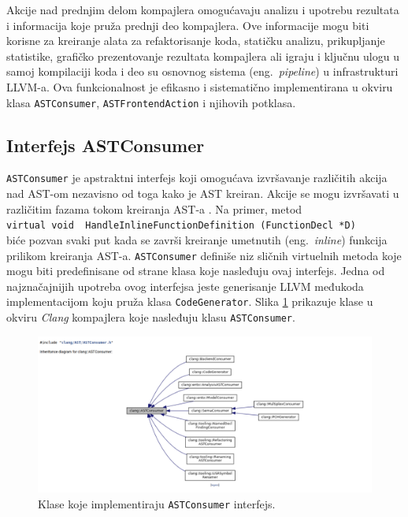 \documentclass[12pt,oneside]{memoir}
\begin{document}
Akcije nad prednjim delom kompajlera omogu\'{c}avaju analizu i upotrebu rezultata i informacija koje pru\v{z}a prednji deo kompajlera. Ove informacije mogu biti korisne za kreiranje alata za refaktorisanje koda, stati\v{c}ku analizu, prikupljanje statistike, grafi\v{c}ko prezentovanje rezultata kompajlera ali igraju i klju\v{c}nu ulogu u samoj kompilaciji koda i deo su osnovnog sistema (eng.~\textit{pipeline}) u infrastrukturi LLVM-a.
Ova funkcionalnost je efikasno i sistemati\v{c}no implementirana u okviru klasa \texttt{ASTConsumer}, \texttt{ASTFrontendAction} i njihovih potklasa.

\subsection{Interfejs ASTConsumer}
\texttt{ASTConsumer} je apstraktni interfejs koji omogu\'{c}ava izvr\v{s}avanje razli\v{c}itih akcija nad AST-om nezavisno od toga kako je AST kreiran.
Akcije se mogu izvr\v{s}avati u razli\v{c}itim fazama tokom kreiranja AST-a \cite{ASTToolTutorial}. Na primer, metod \\ \lstinline[style=customc]{virtual void  HandleInlineFunctionDefinition (FunctionDecl *D)} \\ bi\'{c}e pozvan svaki put kada se zavr\v{s}i kreiranje umetnutih (eng.~\textit{inline}) funkcija prilikom kreiranja AST-a. \texttt{ASTConsumer} defini\v{s}e niz sli\v{c}nih virtuelnih metoda koje mogu biti predefinisane od strane klasa koje nasleđuju ovaj interfejs. Jedna od najzna\v{c}ajnijih upotreba ovog interfejsa jeste generisanje LLVM međukoda implementacijom koju pru\v{z}a klasa \texttt{CodeGenerator}. Slika \ref{fig:inhDiagram} prikazuje klase u okviru \textit{Clang} kompajlera koje nasleđuju klasu \texttt{ASTConsumer}.

\begin{figure}[!h]
\begin{center}
\includegraphics[scale=0.3]{ASTConsumer2.png}
\end{center}
\caption{Klase koje implementiraju \texttt{ASTConsumer} interfejs.}
\label{fig:inhDiagram}
\end{figure}
\end{document}
